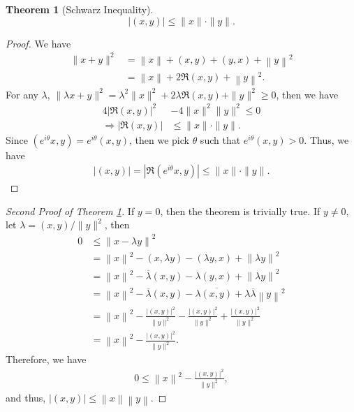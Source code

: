 \documentclass[11pt]{book}
\newtheorem{theorem}{Theorem}[chapter]
\theoremstyle{definition}
\numberwithin{equation}{chapter}
\begin{document}
\begin{theorem}[Schwarz Inequality]\label{schwarz_inequality}
$$\left|(x,y)\right|\leq \|x\|\cdot \|y\|.$$
\end{theorem}
\begin{proof}
We have 
\begin{align*}
    \|x+y\|^2 & = \left\|x\right\| + (x,y) + (y,x) + \left\|y\right\|^2 \\
    & = \left\|x\right\| + 2\Re (x,y) + \left\|y\right\|^2.
\end{align*}
For any $\lambda$, $\|\lambda x + y\|^2 = \lambda^2 \|x\|^2 + 2\lambda \Re (x,y) + \|y\|^2 \geq 0$, then we have
\begin{align*}
    4\left|\Re (x,y)\right|^2 & - 4\|x\|^2 \|y\|^2 \leq 0 \\
    \Rightarrow \left|\Re (x,y)\right| & \leq \|x\|\cdot \|y\|. 
\end{align*}
Since $\left(e^{i\theta}x,y\right) = e^{i\theta}(x,y)$, then we pick $\theta$ such that $e^{i\theta}(x,y) > 0$. Thus, we have
\begin{align*}
    \left|(x,y)\right| = \left|\Re (e^{i\theta}x,y)\right| \leq \|x\|\cdot \|y\|.
\end{align*}
\end{proof}

\medskip

\begin{proof}[Second Proof of Theorem \ref{schwarz_inequality}]
If $y = 0$, then the theorem is trivially true. If $y \neq 0$, let $\lambda = (x,y) / \|y\|^2$, then
\begin{align*}
    0 & \leq \left\|x - \lambda y\right\|^2 \\
    & = \left\|x\right\|^2 - (x,\lambda y) - (\lambda y,x) + \left\|\lambda y\right\|^2 \\
    & = \left\|x\right\|^2 - \overline{\lambda} (x,y) - \lambda (y,x) + \left\|\lambda y\right\|^2 \\
    & = \left\|x\right\|^2 - \overline{\lambda} (x,y) - \lambda \overline{(x,y)} +  \lambda \overline{\lambda} \left\|y\right\|^2 \\
    & = \left\|x\right\|^2 - \frac{\left|(x,y)\right|^2}{\|y\|^2} - \frac{\left|(x,y)\right|^2}{\|y\|^2} + \frac{\left|(x,y)\right|^2}{\|y\|^2} \\
    & = \left\|x\right\|^2 - \frac{\left|(x,y)\right|^2}{\|y\|^2}.
\end{align*}
Therefore, we have
\begin{align*}
    0 \leq \left\|x\right\|^2 - \frac{\left|(x,y)\right|^2}{\|y\|^2},
\end{align*}
and thus, $\left|(x,y)\right| \leq \left\|x\right\| \left\|y\right\|$.
\end{proof}
\end{document}
